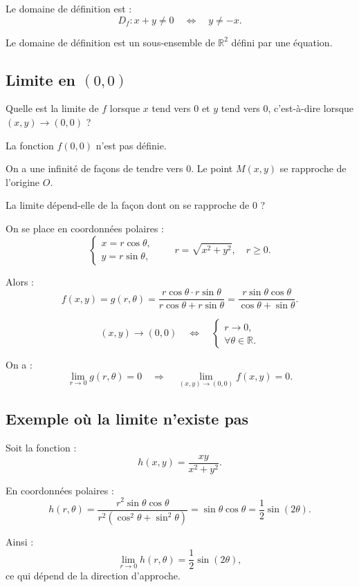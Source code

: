 \documentclass[11pt]{article}
\begin{document}
Le domaine de définition est :
\[
D_f : x+y \neq 0 \quad \Leftrightarrow \quad y \neq -x.
\]

Le domaine de définition est un sous-ensemble de $\mathbb{R}^2$ défini par une équation.

\subsection*{Limite en $(0,0)$}

Quelle est la limite de $f$ lorsque $x$ tend vers $0$ et $y$ tend vers $0$, c’est-à-dire
lorsque $(x,y) \to (0,0)$ ?

La fonction $f(0,0)$ n’est pas définie.

On a une infinité de façons de tendre vers $0$.
Le point $M(x,y)$ se rapproche de l’origine $O$.

La limite dépend-elle de la façon dont on se rapproche de $0$ ?

On se place en coordonnées polaires :
\[
\begin{cases}
x = r\cos\theta, \\
y = r\sin\theta,
\end{cases}
\qquad r = \sqrt{x^2 + y^2}, \quad r \ge 0.
\]

Alors :
\[
f(x,y) = g(r,\theta)
= \frac{r\cos\theta \cdot r\sin\theta}{r\cos\theta + r\sin\theta}
= \frac{r\sin\theta\cos\theta}{\cos\theta + \sin\theta}.
\]

\[
(x,y) \to (0,0)
\quad \Longleftrightarrow \quad
\begin{cases}
r \to 0, \\
\forall \theta \in \mathbb{R}.
\end{cases}
\]

On a :
\[
\lim_{r \to 0} g(r,\theta) = 0
\quad \Longrightarrow \quad
\lim_{(x,y)\to(0,0)} f(x,y) = 0.
\]

\subsection*{Exemple où la limite n’existe pas}

Soit la fonction :
\[
h(x,y) = \frac{xy}{x^2 + y^2}.
\]

En coordonnées polaires :
\[
h(r,\theta)
= \frac{r^2\sin\theta\cos\theta}{r^2(\cos^2\theta + \sin^2\theta)}
= \sin\theta\cos\theta
= \frac{1}{2}\sin(2\theta).
\]

Ainsi :
\[
\lim_{r \to 0} h(r,\theta) = \frac{1}{2}\sin(2\theta),
\]
ce qui dépend de la direction d’approche.
\end{document}
